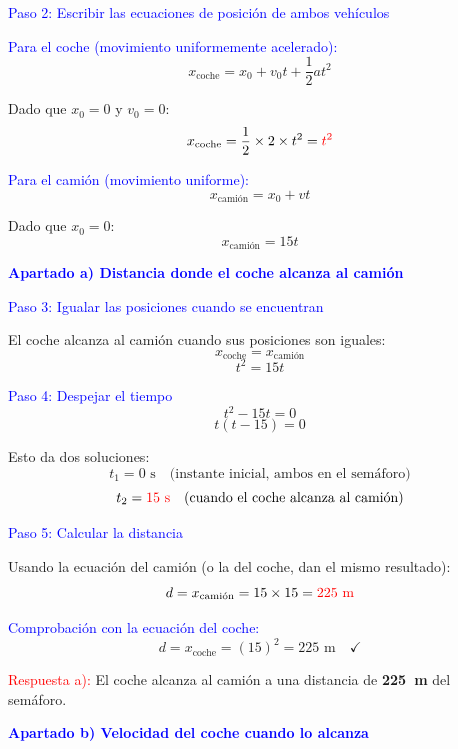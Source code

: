 \begin{exercise}
\begin{solu}
        \textcolor{blue}{Paso 2: Escribir las ecuaciones de posición de ambos vehículos}

        \textcolor{blue}{Para el coche (movimiento uniformemente acelerado):}
        \[
            \boxed{x_{\text{coche}} = x_0 + v_0 t + \frac{1}{2}at^2}
        \]

        Dado que $x_0 = 0$ y $v_0 = 0$:
        \[
            x_{\text{coche}} = \frac{1}{2} \times 2 \times t^2 = \textcolor{red}{t^2}
        \]

        \textcolor{blue}{Para el camión (movimiento uniforme):}
        \[
            \boxed{x_{\text{camión}} = x_0 + vt}
        \]

        Dado que $x_0 = 0$:
        \[
            x_{\text{camión}} = 15t
        \]

        \textbf{\textcolor{blue}{Apartado a) Distancia donde el coche alcanza al camión}}

        \textcolor{blue}{Paso 3: Igualar las posiciones cuando se encuentran}

        El coche alcanza al camión cuando sus posiciones son iguales:
        \[
            x_{\text{coche}} = x_{\text{camión}}
        \]
        \[
            t^2 = 15t
        \]

        \textcolor{blue}{Paso 4: Despejar el tiempo}
        \[
            t^2 - 15t = 0
        \]
        \[
            t(t - 15) = 0
        \]

        Esto da dos soluciones:
        \[
            t_1 = 0 \text{ s} \quad \text{(instante inicial, ambos en el semáforo)}
        \]
        \[
            t_2 = \textcolor{red}{15 \text{ s}} \quad \text{(cuando el coche alcanza al camión)}
        \]

        \textcolor{blue}{Paso 5: Calcular la distancia}

        Usando la ecuación del camión (o la del coche, dan el mismo resultado):
        \[
            d = x_{\text{camión}} = 15 \times 15 = \textcolor{red}{225 \text{ m}}
        \]

        \textcolor{blue}{Comprobación con la ecuación del coche:}
        \[
            d = x_{\text{coche}} = (15)^2 = 225 \text{ m} \quad \checkmark
        \]

        \textcolor{red}{Respuesta a):} El coche alcanza al camión a una distancia de \textbf{\qty{225}{\m}} del semáforo.

        \vspace{0.5cm}

        \textbf{\textcolor{blue}{Apartado b) Velocidad del coche cuando lo alcanza}}


\end{solu}
\end{exercise}
